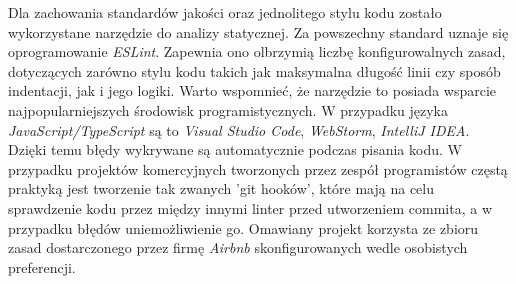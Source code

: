 \documentclass[skorowidz,skroty]{dyplomWEZUT}
\begin{document}
Dla zachowania standardów jakości oraz jednolitego stylu kodu zostało wykorzystane narzędzie do analizy statycznej. Za powszechny standard uznaje się oprogramowanie \textit{ESLint}. Zapewnia ono olbrzymią liczbę konfigurowalnych zasad, dotyczących zarówno stylu kodu takich jak maksymalna długość linii czy sposób indentacji, jak i jego logiki. Warto wspomnieć, że narzędzie to posiada wsparcie najpopularniejszych środowisk programistycznych. W przypadku języka \textit{JavaScript/TypeScript} są to \textit{Visual Studio Code}, \textit{WebStorm}, \textit{IntelliJ IDEA}. Dzięki temu błędy wykrywane są automatycznie podczas pisania kodu. W przypadku projektów komercyjnych tworzonych przez zespół programistów częstą praktyką jest tworzenie tak zwanych 'git hooków', które mają na celu sprawdzenie kodu przez między innymi linter przed utworzeniem commita, a w przypadku błędów uniemożliwienie go. Omawiany projekt korzysta ze zbioru zasad dostarczonego przez firmę \textit{Airbnb} skonfigurowanych wedle osobistych preferencji.
\end{document}
